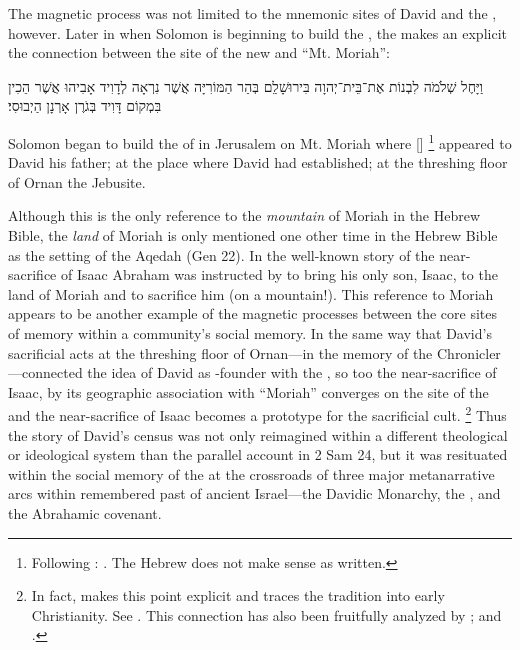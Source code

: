 The magnetic process was not limited to the mnemonic sites of David and the \temple, however. Later in \chronicles when Solomon is beginning to build the \temple, the \chronicler makes an explicit the connection between the site of the new \temple and ``Mt. Moriah'':
\begin{hebrewtext}
    וַיָּחֶל שְׁלֹמֹה לִבְנוֹת אֶת־בֵּית־יְהוָה בִּירוּשָׁלִַם בְּהַר הַמּוֹרִיָּה אֲשֶׁר נִרְאָה לְדָוִיד אָבִיהוּ אֲשֶׁר הֵכִין בִּמְקוֹם דָּוִיד בְּגֹרֶן אָרְנָן הַיְבוּסִי׃
\end{hebrewtext}
\begin{translation}
    Solomon began to build the \temple of \yahweh in Jerusalem on Mt. Moriah where [\yahweh]%
        \footnote{Following \lxx: 
        .
        The Hebrew does not make sense as written.}
    appeared to David his father;
    at the place where David had established; 
    at the threshing floor of Ornan the Jebusite.
\end{translation}
\noindent
Although this is the only reference to the \emph{mountain} of Moriah in the Hebrew Bible, the \emph{land} of Moriah is only mentioned one other time in the Hebrew Bible as the setting of the Aqedah (Gen 22). In the well-known story of the near-sacrifice of Isaac Abraham was instructed by \yahweh to bring his only son, Isaac,  to the land of Moriah and to sacrifice him (on a mountain!). This reference to Moriah appears to be another example of the magnetic processes between the core sites of memory within a community's social memory. In the same way that David's sacrificial acts at the threshing floor of Ornan---in the memory of the Chronicler---connected the idea of David as \temple-founder with the \jerusalemtemple, so too the near-sacrifice of Isaac, by its geographic association with ``Moriah'' converges on the site of the \jerusalemtemple and the near-sacrifice of Isaac becomes a prototype for the sacrificial cult.%
    \footnote{In fact, \vermes makes this point explicit and traces the tradition into early Christianity. See \cite[204--211]{vermes1961}. This connection has also been fruitfully analyzed by \cite{kalimi_htr1990}; \cite[190--191]{kalimi_jnes2009} and \cite{amit_brenner-polak2009}.}
Thus the story of David's census was not only reimagined within a different theological or ideological system than the parallel account in 2 Sam 24, but it was resituated within the social memory of the \chronicler at the crossroads of three major metanarrative arcs within remembered past of ancient Israel---the Davidic Monarchy, the \jerusalemtemple, and the Abrahamic covenant.

